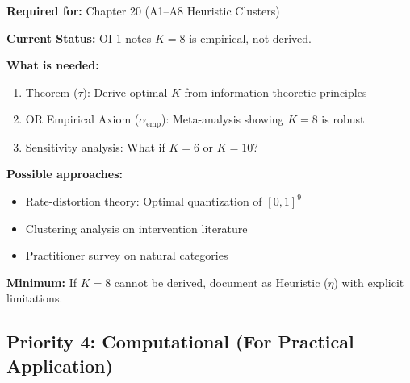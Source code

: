 \begin{tcolorbox}[colback=green!5!white, colframe=green!75!black,
    title=\textbf{TODO-IE-9: Cluster Emergence Theorem (K=8)}]

\textbf{Required for:} Chapter 20 (A1--A8 Heuristic Clusters)

\textbf{Current Status:} OI-1 notes $K=8$ is empirical, not derived.

\textbf{What is needed:}
\begin{enumerate}[nosep]
    \item Theorem ($\tau$): Derive optimal $K$ from information-theoretic principles
    \item OR Empirical Axiom ($\alpha_{\text{emp}}$): Meta-analysis showing $K=8$ is robust
    \item Sensitivity analysis: What if $K=6$ or $K=10$?
\end{enumerate}

\textbf{Possible approaches:}
\begin{itemize}[nosep]
    \item Rate-distortion theory: Optimal quantization of $[0,1]^9$
    \item Clustering analysis on intervention literature
    \item Practitioner survey on natural categories
\end{itemize}

\textbf{Minimum:} If $K=8$ cannot be derived, document as Heuristic ($\eta$) with explicit limitations.

\end{tcolorbox}

\subsection{Priority 4: Computational (For Practical Application)}

